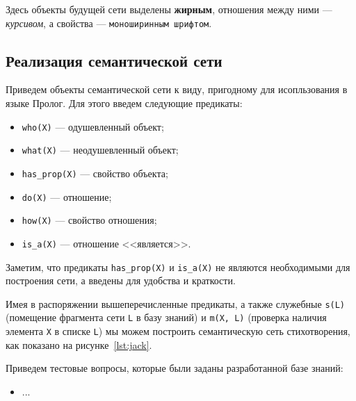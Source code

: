 Здесь объекты будущей сети выделены \textbf{жирным},
отношения между ними --- \textit{курсивом}, 
а свойства --- \texttt{моноширинным шрифтом}. 


\subsection{Реализация семантической сети}

Приведем объекты семантической сети к виду, 
пригодному для исопльзования в языке Пролог.
Для этого введем следующие предикаты:

\begin{itemize}
\item \texttt{who(X)} --- одушевленный объект;
\item \texttt{what(X)} --- неодушевленный объект;
\item \texttt{has\_prop(X)} --- свойство объекта;
\item \texttt{do(X)} --- отношение;
\item \texttt{how(X)} --- свойство отношения;
\item \texttt{is\_a(X)} --- отношение <<является>>.
\end{itemize}

Заметим, что предикаты \texttt{has\_prop(X)} и \texttt{is\_a(X)}
не являются необходимыми для построения сети, 
а введены для удобства и краткости.

Имея в распоряжении вышеперечисленные предикаты, 
а также служебные
\texttt{s(L)} (помещение фрагмента сети \texttt{L} в базу знаний) и
\texttt{m(X, L)} (проверка наличия элемента \texttt{X} в списке \texttt{L})
мы можем построить семантическую сеть стихотворения, 
как показано на рисунке~\ref{lst:jack}.

\pagebreak


                 
\pagebreak

Приведем тестовые вопросы, которые были заданы разработанной базе знаний:
\begin{itemize}
\item ...
\end{itemize}

\newpage